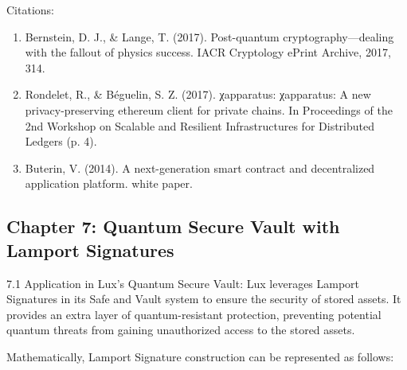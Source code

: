 \documentclass[11pt]{article}
\begin{document}
Citations:

\begin{enumerate}
  \item Bernstein, D. J., \& Lange, T. (2017). Post-quantum cryptography---dealing with the fallout of physics success. IACR Cryptology ePrint Archive, 2017, 314.
  \item Rondelet, R., \& Béguelin, S. Z. (2017). χapparatus: χapparatus: A new privacy-preserving ethereum client for private chains. In Proceedings of the 2nd Workshop on Scalable and Resilient Infrastructures for Distributed Ledgers (p. 4).
  \item Buterin, V. (2014). A next-generation smart contract and decentralized application platform. white paper.
\end{enumerate}

\subsection{Chapter 7: Quantum Secure Vault with Lamport Signatures}

7.1 Application in Lux's Quantum Secure Vault: Lux leverages Lamport Signatures in its Safe and Vault system to ensure the security of stored assets. It provides an extra layer of quantum-resistant protection, preventing potential quantum threats from gaining unauthorized access to the stored assets.


Mathematically, Lamport Signature construction can be represented as follows:
\end{document}
